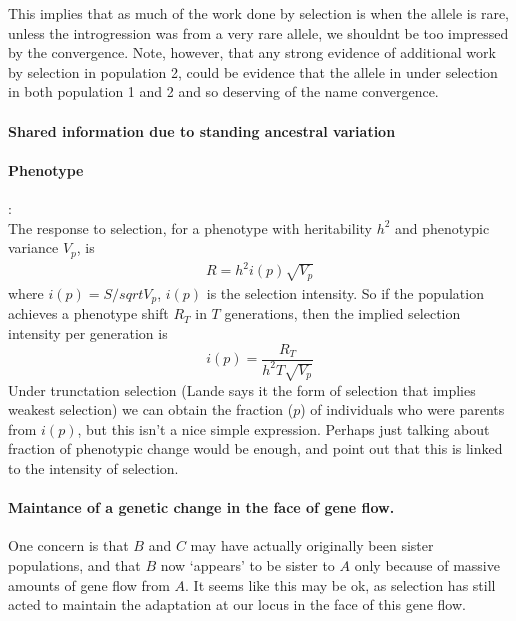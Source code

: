 \documentclass[a4paper,10pt]{article}
\begin{document}
This implies that as much of the work done by selection is when the
allele is rare, unless the introgression was from a very rare allele, we
shouldnt be too impressed by the convergence. Note, however, that any
strong evidence of additional work by selection in population 2, could
be evidence that the allele in under selection in both population 1
and 2 and so deserving of the name convergence. 

\paragraph{Shared information due to standing ancestral variation}


\paragraph{Phenotype}:\\
The response to selection, for a phenotype with heritability $h^2$ and
phenotypic variance $V_p$, is 
\begin{align}
R = h^2 i(p) \sqrt{V_p}
\end{align}
where $i(p)=S/sqrt{V_p}$, $i(p)$ is the selection intensity. So if the
population achieves a phenotype shift $R_T$ in $T$ generations, then
the implied selection intensity per generation is 
\begin{equation}
i(p) = \frac{R_T}{h^2 T \sqrt{V_p}}
\end{equation}  
Under trunctation selection (Lande says it the form of selection that
implies weakest selection) we can obtain the fraction ($p$) of individuals
who were parents from $i(p)$, but this isn't a nice simple
expression. Perhaps just talking about fraction of phenotypic change would be
enough, and point out that this is linked to the intensity of
selection. 


\paragraph{Maintance of a genetic change in the face of gene flow. }
One concern is that $B$ and $C$ may have actually originally been
sister populations, and that $B$ now `appears' to be sister to $A$
only because of massive amounts of gene flow from $A$. 
It seems like this may be ok, as selection has still acted to maintain
the adaptation at our locus in the face of this gene flow. 

\end{document}
